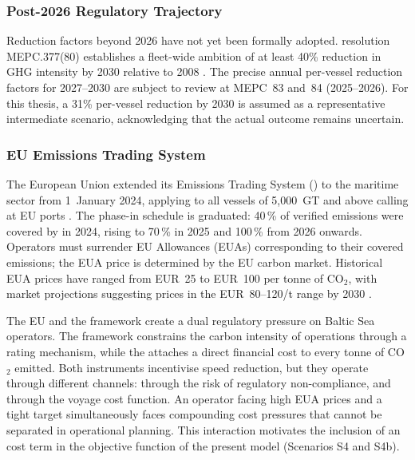 \subsubsection{Post-2026 Regulatory Trajectory}
\label{sec:lit:post2026}

Reduction factors beyond 2026 have not yet been formally adopted.
\IMO{} resolution MEPC.377(80) establishes a fleet-wide ambition of at
least 40\% reduction in GHG intensity by 2030 relative to 2008
\parencite{mepc377}. The precise annual per-vessel reduction factors for
2027--2030 are subject to review at MEPC~83 and~84 (2025--2026).
For this thesis, a 31\% per-vessel reduction by 2030 is assumed as a
representative intermediate scenario, acknowledging that the actual
outcome remains uncertain.

\subsubsection{EU Emissions Trading System}
\label{sec:lit:ets}

The European Union extended its Emissions Trading System (\ETS{}) to the
maritime sector from 1~January 2024, applying to all vessels of 5{,}000~GT
and above calling at EU ports \parencite{eu_ets_shipping}.  The phase-in
schedule is graduated: 40\,\% of verified emissions were covered by \ETS{}
in 2024, rising to 70\,\% in 2025 and 100\,\% from 2026 onwards.  Operators
must surrender EU Allowances (EUAs) corresponding to their covered emissions;
the EUA price is determined by the EU carbon market.  Historical EUA prices
have ranged from EUR~25 to EUR~100 per tonne of CO$_2$, with market
projections suggesting prices in the EUR~80--120/t range by 2030
\parencite{eu_ets_shipping}.

The EU \ETS{} and the \IMO{} \CII{} framework create a dual regulatory
pressure on Baltic Sea operators.  The \CII{} framework constrains the carbon
intensity of operations through a rating mechanism, while the \ETS{} attaches
a direct financial cost to every tonne of CO$_2$ emitted.  Both instruments
incentivise speed reduction, but they operate through different channels: \CII{}
through the risk of regulatory non-compliance, and \ETS{} through the voyage
cost function.  An operator facing high EUA prices and a tight \CII{} target
simultaneously faces compounding cost pressures that cannot be separated in
operational planning.  This interaction motivates the inclusion of an \ETS{}
cost term in the objective function of the present model (Scenarios S4 and S4b).

